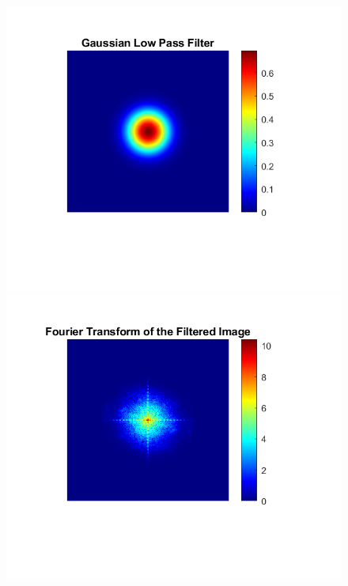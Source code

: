 \documentclass{article}
\begin{document}
\begin{figure}[!htb]
    \centering
    \begin{minipage}[b]{0.3\textwidth}
        \includegraphics[width=\textwidth]{Gaussian_Low_Pass_Filter.png}
    \end{minipage}
    \begin{minipage}[b]{0.3\textwidth}
        \includegraphics[width=\textwidth]{Gaussian_Fourier_Transform_Filtered.png}

\end{minipage}
\end{figure}
\end{document}
